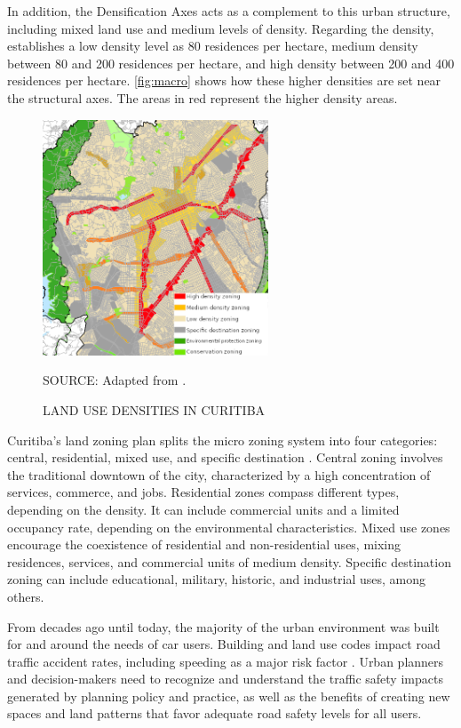 In addition, the Densification Axes acts as a complement to this urban structure, including mixed land use and medium levels of density. Regarding the density, \textcite{Curitiba2015} establishes a low density level as 80 residences per hectare, medium density between 80 and 200 residences per hectare, and high density between 200 and 400 residences per hectare. \autoref{fig:macro} shows how these higher densities are set near the structural axes. The areas in red represent the higher density areas. 

\begin{figure}[!htbp]
    \centering\footnotesize
    \captionsetup{font=footnotesize}
    \caption{LAND USE DENSITIES IN CURITIBA}
    \includegraphics[width=0.6\textwidth]{fig/macro3.png}
    \label{fig:macro}
    \par SOURCE: Adapted from \textcite{Curitiba2015}.
\end{figure}

Curitiba's land zoning plan splits the micro zoning system into four categories: central, residential, mixed use, and specific destination \cite{Curitiba2019a}. Central zoning involves the traditional downtown of the city, characterized by a high concentration of services, commerce, and jobs. Residential zones compass different types, depending on the density. It can include commercial units and a limited occupancy rate, depending on the environmental characteristics. Mixed use zones encourage the coexistence of residential and non-residential uses, mixing residences, services, and commercial units of medium density. Specific destination zoning can include educational, military, historic, and industrial uses, among others. 

From decades ago until today, the majority of the urban environment was built for and around the needs of car users. Building and land use codes impact road traffic accident rates, including speeding as a major risk factor \cite{Knoflacher2016}. Urban planners and decision-makers need to recognize and understand the traffic safety impacts generated by planning policy and practice, as well as the benefits of creating new spaces and land patterns that favor adequate road safety levels for all users. 

